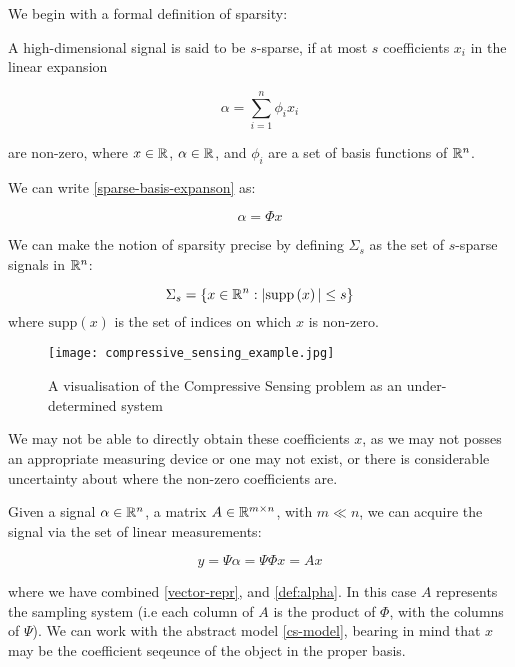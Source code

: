 We begin with a formal definition of sparsity:

\begin{definition}[Sparsity]

A high-dimensional signal is said to be \(s\)-sparse, if at most \(s\) coefficients \(x_i\) in the linear expansion 

\begin{equation}
\alpha = \sum	_{i=1}^{n} \phi_i x_i 
\end{equation}
\label{sparse-basis-expanson}

are non-zero, where \(x \in {\mathbb{R}}\), \(\alpha \in {\mathbb{R}}\), and \(\phi_i\) are a set of basis functions of \({\mathbb{R}}^n\). 

We can write \eqref{sparse-basis-expanson} as:

\begin{equation}
\alpha = \Phi x
\end{equation}
\label{def:alpha}

We can make the notion of sparsity precise by defining \(\Sigma_s\) as the set of \(s\)-sparse signals in \({\mathbb{R}}^n\):

\begin{equation}
\Sigma_s = \{ x \in {\mathbb{R}}^n : |\mathrm{supp} \left(x\right) |\leq s\}
\end{equation}
where \(\mathrm{supp}\left(x\right) \) is the set of indices on which \(x\) is non-zero.
\end{definition}

\begin{figure*}[h]
\centering
\texttt{[image: compressive\_sensing\_example.jpg]}
\caption{A visualisation of the Compressive Sensing problem as an under-determined system}
\label{l1l2}
\end{figure*}

We may not be able to directly obtain these coefficients \(x\), as we may not posses an appropriate measuring device or one may not exist, or there is considerable uncertainty about where the non-zero coefficients are. 

Given a signal \(\alpha \in {\mathbb{R}}^n\), a matrix \(A \in {\mathbb{R}}^{m \times n}\), with \(m \ll n\),  we can acquire the signal via the set of linear measurements:

\begin{equation}
y = \Psi \alpha = \Psi\Phi x = Ax
\end{equation}
\label{cs-model}

where we have combined \eqref{vector-repr}, and \eqref{def:alpha}. In this case \(A\) represents the sampling system (i.e each column of \(A\) is the product of \(\Phi\), with the columns of \(\Psi\)). We can work with the abstract model \eqref{cs-model}, bearing in mind that \(x\) may be the coefficient seqeunce of the object in the proper basis.

